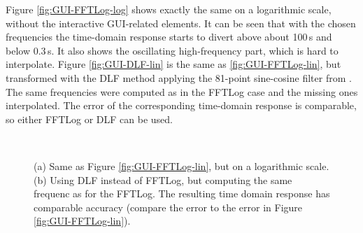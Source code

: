 \documentclass[onecolumn,extra,referee,camera]{gji}
\newlength{\fwidth}
\begin{document}
Figure \ref{fig:GUI-FFTLog-log} shows exactly the same on a logarithmic scale,
without the interactive GUI-related elements. It can be seen that with the
chosen frequencies the time-domain response starts to divert above about 100\,s
and below 0.3\,s. It also shows the oscillating high-frequency part, which is
hard to interpolate. Figure \ref{fig:GUI-DLF-lin} is the same as
\ref{fig:GUI-FFTLog-lin}, but transformed with the DLF method applying the
81-point sine-cosine filter from \cite{GEO.09.Key}. The same frequencies were
computed as in the FFTLog case and the missing ones interpolated. The error of
the corresponding time-domain response is comparable, so either FFTLog or DLF
can be used.
%
\begin{figure}
  \centering
  \hfill
  \\
  \caption{(a) Same as Figure \ref{fig:GUI-FFTLog-lin}, but on a logarithmic
  scale. (b) Using DLF instead of FFTLog, but computing the same
  frequenc as for the FFTLog. The resulting time domain
  response has comparable accuracy (compare the error to the error in Figure
  \ref{fig:GUI-FFTLog-lin}).}
  \label{fig:GUI-log-lin}
\end{figure}
\end{document}
